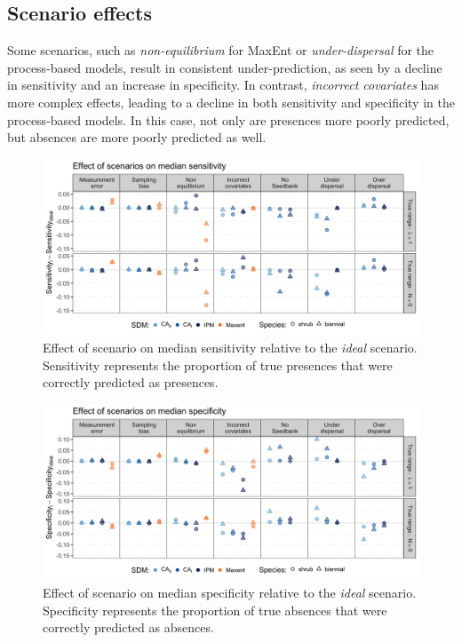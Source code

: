 \documentclass[]{article}
\begin{document}
\newpage
\subsection{Scenario effects}

Some scenarios, such as \emph{non-equilibrium} for MaxEnt or
\emph{under-dispersal} for the process-based models, result in
consistent under-prediction, as seen by a decline in sensitivity and an
increase in specificity. In contrast, \emph{incorrect covariates} has
more complex effects, leading to a decline in both sensitivity and
specificity in the process-based models. In this case, not only are
presences more poorly predicted, but absences are more poorly predicted
as well.

\begin{figure}
    \centering\includegraphics[width=.9\linewidth]{../../figs/Supp_SensvIdeal.jpg}
    \caption{\label{fig:SensitivityvIdeal} Effect of scenario on median sensitivity relative to the \emph{ideal} scenario. Sensitivity represents the proportion of true presences that were correctly predicted as presences.}
\end{figure}

\begin{figure}
    \centering\includegraphics[width=.9\linewidth]{../../figs/Supp_SpecvIdeal.jpg}
    \caption{\label{fig:SpecificityvIdeal} Effect of scenario on median specificity relative to the \emph{ideal} scenario. Specificity represents the proportion of true absences that were correctly predicted as absences.}
\end{figure}
\end{document}

